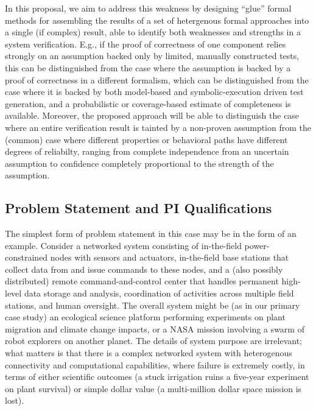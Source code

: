 In this proposal, we aim to address this weakness by designing
``glue'' formal methods for assembling the results of a set of
hetergenous formal approaches into a single (if complex) result, able
to identify both weaknesses and strengths in a system verification.
E.g., if the proof of correctness of one component relies strongly on
an assumption backed only by limited, manually constructed tests, this
can be distinguished from the case where the assumption is backed by a
proof of correctness in a different formalism, which can be
distinguished from the case where it is backed by
both model-based and  symbolic-execution driven test generation, and
a probabilistic or coverage-based estimate of completeness is
available.  Moreover, the proposed approach will be able to distinguish the case
where an entire verification result is tainted by a non-proven
assumption from the (common) case where different properties or
behavioral paths have different degrees of reliabilty, ranging from
complete independence from an uncertain assumption to confidence
completely proportional to the strength of the assumption.


\subsection{Problem Statement and PI Qualifications}

The simplest form of problem statement in this case may be in the form
of an example.  Consider a networked system consisting of in-the-field
power-constrained 
nodes with sensors and actuators, in-the-field base stations that
collect data from and issue commands to these nodes, and a (also
possibly distributed) remote command-and-control center that handles
permanent high-level data storage and analysis, coordination of activities across
multiple field stations, and human oversight.  The overall system might be
(as in our primary case study) an ecological science 
platform performing experiments on plant migration and climate change
impacts, or a NASA mission involving a swarm of robot explorers on
another planet.  The details of system purpose are irrelevant; what
matters is that there is a complex networked system with heterogenous
connectivity and computational capabilities, where failure is
extremely costly, in terms of either scientific outcomes (a stuck
irrigation ruins a five-year experiment on plant survival) or simple
dollar value (a multi-million dollar space mission is lost).

